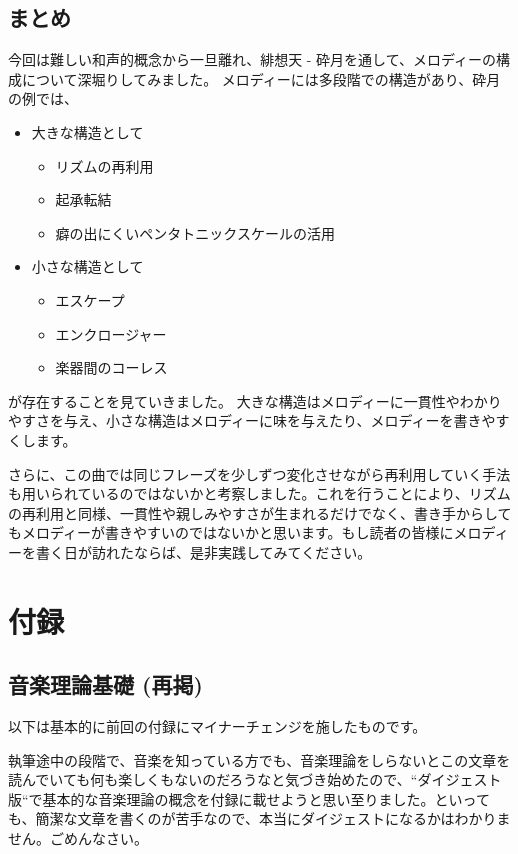 \documentclass[11pt]{ltjarticle}
\begin{document}
\subsection{まとめ}
今回は難しい和声的概念から一旦離れ、緋想天 - 砕月を通して、メロディーの構成について深堀りしてみました。
メロディーには多段階での構造があり、砕月の例では、
\begin{itemize}
    \item 大きな構造として
    \begin{itemize}
        \item リズムの再利用
        \item 起承転結
        \item 癖の出にくいペンタトニックスケールの活用
    \end{itemize}
    \item 小さな構造として
    \begin{itemize}
        \item エスケープ
        \item エンクロージャー
        \item 楽器間のコーレス
    \end{itemize}
\end{itemize}
が存在することを見ていきました。
大きな構造はメロディーに一貫性やわかりやすさを与え、小さな構造はメロディーに味を与えたり、メロディーを書きやすくします。\par 
さらに、この曲では同じフレーズを少しずつ変化させながら再利用していく手法も用いられているのではないかと考察しました。これを行うことにより、リズムの再利用と同様、一貫性や親しみやすさが生まれるだけでなく、書き手からしてもメロディーが書きやすいのではないかと思います。もし読者の皆様にメロディーを書く日が訪れたならば、是非実践してみてください。
\section{付録}
\subsection{音楽理論基礎 (再掲)}
以下は基本的に前回の付録にマイナーチェンジを施したものです。\par 
執筆途中の段階で、音楽を知っている方でも、音楽理論をしらないとこの文章を読んでいても何も楽しくもないのだろうなと気づき始めたので、“ダイジェスト版“で基本的な音楽理論の概念を付録に載せようと思い至りました。といっても、簡潔な文章を書くのが苦手なので、本当にダイジェストになるかはわかりません。ごめんなさい。
\end{document}
